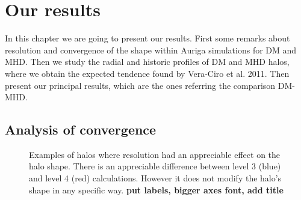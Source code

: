 \chapter{Our results}

In this chapter we are going to present our results. First some remarks about resolution and convergence of the shape within Auriga simulations for DM and MHD. Then we study the radial and historic profiles of DM and MHD halos, where we obtain the expected tendence found by Vera-Ciro et al. 2011. Then present our principal results, which are the ones referring the comparison DM-MHD.

\section{Analysis of convergence}

\begin{figure}[!ht]
  \centering
  \hfill
  \caption{Examples of halos where resolution had an appreciable effect on the halo shape. There is an appreciable difference between level 3 (blue) and level 4 (red) calculations. However it does not modify the halo's shape in any specific way. \textbf{put labels, bigger axes font, add title} }
\end{figure}

